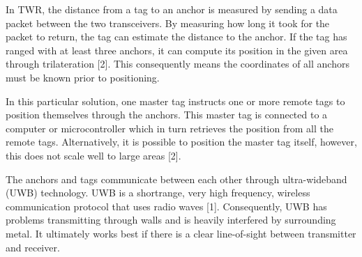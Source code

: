 \documentclass[12pt, a4paper]{article}
\begin{document}
In TWR, the distance from a tag to an anchor is measured by sending a data packet between the two transceivers. By measuring how long it took for the packet to return, the tag can estimate the distance to the anchor. If the tag has ranged with at least three anchors, it can compute its position in the given area through trilateration [2]. This consequently means the coordinates of all anchors must be known prior to positioning.

In this particular solution, one master tag instructs one or more remote tags to position themselves through the anchors. This master tag is connected to a computer or microcontroller which in turn retrieves the position from all the remote tags. Alternatively, it is possible to position the master tag itself, however, this does not scale well to large areas [2].

The anchors and tags communicate between each other through ultra-wideband (UWB) technology. UWB is a shortrange, very high frequency, wireless communication protocol that uses radio waves [1]. Consequently, UWB has problems transmitting through walls and is heavily interfered by surrounding metal. It ultimately works best if there is a clear line-of-sight between transmitter and receiver. 
\end{document}
